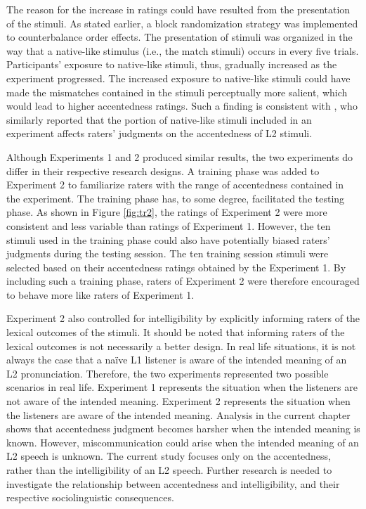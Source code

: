 The reason for the increase in ratings could have resulted from the presentation of the stimuli. As stated earlier, a block randomization strategy was implemented to counterbalance order effects. The presentation of stimuli was organized in the way that a native-like stimulus (i.e., the match stimuli) occurs in every five trials. Participants’ exposure to native-like stimuli, thus, gradually increased as the experiment progressed. The increased exposure to native-like stimuli could have made the mismatches contained in the stimuli perceptually more salient, which would lead to higher accentedness ratings. Such a finding is consistent with \citet{Flege_1992}, who similarly reported that the portion of native-like stimuli included in an experiment affects raters’ judgments on the accentedness of L2 stimuli.

Although Experiments 1 and 2 produced similar results, the two experiments do differ in their respective research designs. A training phase was added to Experiment 2 to familiarize raters with the range of accentedness contained in the experiment. The training phase has, to some degree, facilitated the testing phase. As shown in Figure \ref{fig:tr2}, the ratings of Experiment 2 were more consistent and less variable than ratings of Experiment 1. However, the ten stimuli used in the training phase could also have potentially biased raters’ judgments during the testing session. The ten training session stimuli were selected based on their accentedness ratings obtained by the Experiment 1. By including such a training phase, raters of Experiment 2 were therefore encouraged to behave more like raters of Experiment 1. 

Experiment 2 also controlled for intelligibility by explicitly informing raters of the lexical outcomes of the stimuli. It should be noted that informing raters of the lexical outcomes is not necessarily a better design. In real life situations, it is not always the case that a naïve L1 listener is aware of the intended meaning of an L2 pronunciation. Therefore, the two experiments represented two possible scenarios in real life. Experiment 1 represents the situation when the listeners are not aware of the intended meaning. Experiment 2 represents the situation when the listeners are aware of the intended meaning. Analysis in the current chapter shows that accentedness judgment becomes harsher when the intended meaning is known. However, miscommunication could arise when the intended meaning of an L2 speech is unknown. The current study focuses only on the accentedness, rather than the intelligibility of an L2 speech. Further research is needed to investigate the relationship between accentedness and intelligibility, and their respective sociolinguistic consequences. 

